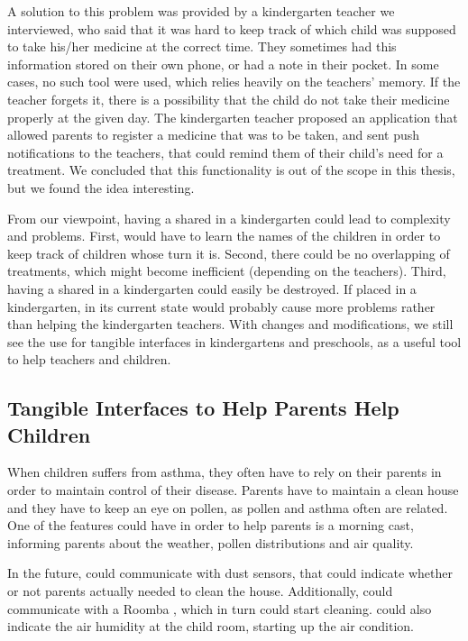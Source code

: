 A solution to this problem was provided by a kindergarten teacher we interviewed, who said that it was hard to keep track of which child was supposed to take his/her medicine at the correct time. They sometimes had this information stored on their own phone, or had a note in their pocket. In some cases, no such tool were used, which relies heavily on the teachers' memory. If the teacher forgets it, there is a possibility that the child do not take their medicine properly at the given day. 
The kindergarten teacher proposed an application that allowed parents to register a medicine that was to be taken, and sent push notifications to the teachers, that could remind them of their child's need for a treatment. We concluded that this functionality is out of the scope in this thesis, but we found the idea interesting.         

From our viewpoint, having a shared \buddy{} in a kindergarten could lead to complexity and problems. First, \buddy{} would have to learn the names of the children in order to keep track of children whose turn it is. Second, there could be no overlapping of treatments, which might become inefficient (depending on the teachers). Third, having a shared \buddy{} in a kindergarten could easily be destroyed. If placed in a kindergarten, \buddy{} in its current state would probably cause more problems rather than helping the kindergarten teachers. With changes and modifications, we still see the use for tangible interfaces in kindergartens and preschools, as a useful tool to help teachers and children.    


\subsection{Tangible Interfaces to Help Parents Help Children}
When children suffers from asthma, they often have to rely on their parents in order to maintain control of their disease. Parents have to maintain a clean house and they have to keep an eye on pollen, as pollen and asthma often are related. One of the features \buddy{} could have in order to help parents is a morning cast, informing parents about the weather, pollen distributions and air quality. 

In the future, \buddy{} could communicate with dust sensors, that could indicate whether or not parents actually needed to clean the house. Additionally, \buddy{} could communicate with a Roomba , which in turn could start cleaning. \buddy{} could also indicate the air humidity at the child room, starting up the air condition.   



